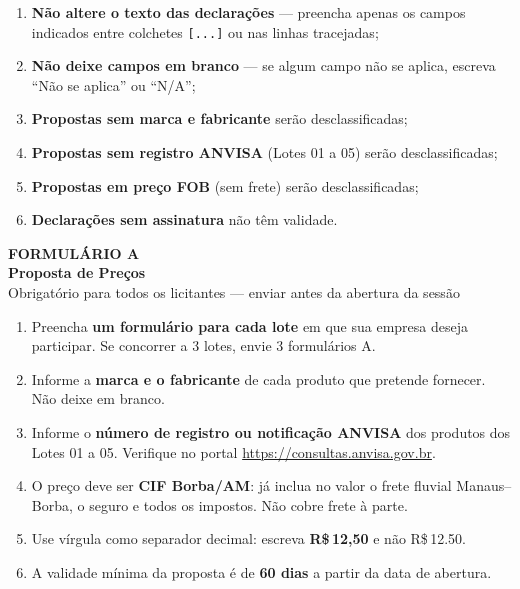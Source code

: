 \documentclass[12pt,a4paper]{article}
\newcommand{\formulario}[3]{%
  \clearpage
  \begin{tcolorbox}[enhanced,colback=navy,colframe=navy,arc=6pt,
    left=14pt,right=14pt,top=10pt,bottom=10pt]
    \color{white}
    {\large\bfseries FORMULÁRIO #1}\\[4pt]
    {\Large\bfseries #2}\\[4pt]
    {\small\color{ltblue} #3}
  \end{tcolorbox}
  \vspace{0.3cm}}
\begin{document}
\begin{errobox}
\small
\begin{enumerate}[leftmargin=*,topsep=2pt,itemsep=2pt]
  \item \textbf{Não altere o texto das declarações} --- preencha apenas os campos
    indicados entre colchetes \texttt{[...]} ou nas linhas tracejadas;
  \item \textbf{Não deixe campos em branco} --- se algum campo não se aplica,
    escreva ``Não se aplica'' ou ``N/A'';
  \item \textbf{Propostas sem marca e fabricante} serão desclassificadas;
  \item \textbf{Propostas sem registro ANVISA} (Lotes 01 a 05) serão desclassificadas;
  \item \textbf{Propostas em preço FOB} (sem frete) serão desclassificadas;
  \item \textbf{Declarações sem assinatura} não têm validade.
\end{enumerate}
\end{errobox}

\tableofcontents

\formulario{A}{Proposta de Preços}{%
  Obrigatório para todos os licitantes --- enviar antes da abertura da sessão}

\begin{dicabox}
\small
\begin{enumerate}[leftmargin=*,topsep=2pt,itemsep=2pt]
  \item Preencha \textbf{um formulário para cada lote} em que sua empresa
    deseja participar. Se concorrer a 3 lotes, envie 3 formulários A.
  \item Informe a \textbf{marca e o fabricante} de cada produto que pretende
    fornecer. Não deixe em branco.
  \item Informe o \textbf{número de registro ou notificação ANVISA} dos produtos
    dos Lotes 01 a 05. Verifique no portal \url{https://consultas.anvisa.gov.br}.
  \item O preço deve ser \textbf{CIF Borba/AM}: já inclua no valor o frete
    fluvial Manaus--Borba, o seguro e todos os impostos. Não cobre frete à parte.
  \item Use vírgula como separador decimal: escreva \textbf{R\$\,12,50} e não
    R\$\,12.50.
  \item A validade mínima da proposta é de \textbf{60 dias} a partir da data
    de abertura.
\end{enumerate}
\end{dicabox}
\end{document}
